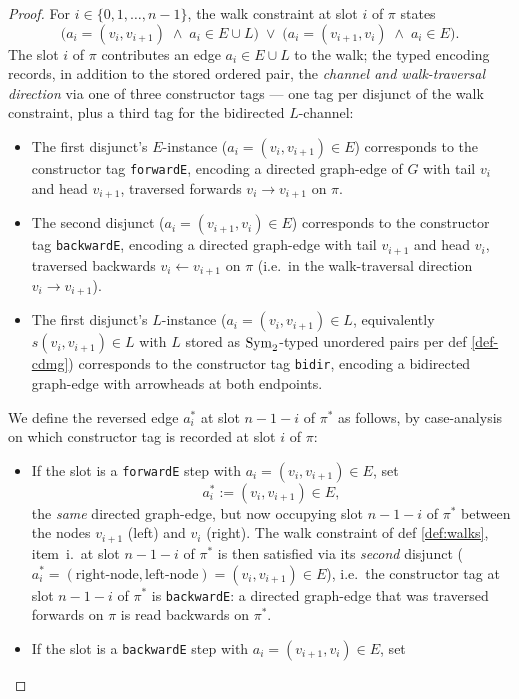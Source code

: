 \documentclass[main]{subfiles}
\begin{document}
\begin{proof}
For $i \in \{0, 1, \dots, n - 1\}$, the walk constraint at slot $i$ of $\pi$ states
\[
    \bigl(a_i = (v_i, v_{i+1}) \;\land\; a_i \in E \cup L\bigr)
    \;\lor\;
    \bigl(a_i = (v_{i+1}, v_i) \;\land\; a_i \in E\bigr).
\]
The slot $i$ of $\pi$ contributes an edge $a_i \in E \cup L$ to the walk; the typed encoding records, in addition to the stored ordered pair, the \emph{channel and walk-traversal direction} via one of three constructor tags --- one tag per disjunct of the walk constraint, plus a third tag for the bidirected $L$-channel:
\begin{itemize}
    \item[(F$_E$)] The first disjunct's $E$-instance ($a_i = (v_i, v_{i+1}) \in E$) corresponds to the constructor tag \texttt{forwardE}, encoding a directed graph-edge of $G$ with tail $v_i$ and head $v_{i+1}$, traversed forwards $v_i \to v_{i+1}$ on $\pi$.
    \item[(B$_E$)] The second disjunct ($a_i = (v_{i+1}, v_i) \in E$) corresponds to the constructor tag \texttt{backwardE}, encoding a directed graph-edge with tail $v_{i+1}$ and head $v_i$, traversed backwards $v_i \leftarrow v_{i+1}$ on $\pi$ (i.e.\ in the walk-traversal direction $v_i \to v_{i+1}$).
    \item[(L)] The first disjunct's $L$-instance ($a_i = (v_i, v_{i+1}) \in L$, equivalently $s(v_i, v_{i+1}) \in L$ with $L$ stored as $\mathrm{Sym}_2$-typed unordered pairs per def \ref{def-cdmg}) corresponds to the constructor tag \texttt{bidir}, encoding a bidirected graph-edge with arrowheads at both endpoints.
\end{itemize}
We define the reversed edge $a_i^*$ at slot $n - 1 - i$ of $\pi^*$ as follows, by case-analysis on which constructor tag is recorded at slot $i$ of $\pi$:
\begin{itemize}
    \item[(F$_E$)] If the slot is a \texttt{forwardE} step with $a_i = (v_i, v_{i+1}) \in E$, set
        \[
            a_i^* := (v_i, v_{i+1}) \in E,
        \]
        the \emph{same} directed graph-edge, but now occupying slot $n - 1 - i$ of $\pi^*$ between the nodes $v_{i+1}$ (left) and $v_i$ (right). The walk constraint of def \ref{def:walks}, item~i.\ at slot $n - 1 - i$ of $\pi^*$ is then satisfied via its \emph{second} disjunct ($a_i^* = (\text{right-node}, \text{left-node}) = (v_i, v_{i+1}) \in E$), i.e.\ the constructor tag at slot $n - 1 - i$ of $\pi^*$ is \texttt{backwardE}: a directed graph-edge that was traversed forwards on $\pi$ is read backwards on $\pi^*$.
    \item[(B$_E$)] If the slot is a \texttt{backwardE} step with $a_i = (v_{i+1}, v_i) \in E$, set

\end{itemize}
\end{proof}
\end{document}

